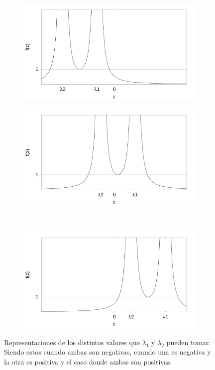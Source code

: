 \documentclass[12pt]{article}
\begin{document}
\begin{figure}[h]
\centering
 \begin{subfigure}[b]{0.4\textwidth}
 	 \includegraphics[width=\textwidth]{grafica_lambdas_negativas.png}
 	 \caption{}
 	 \label{fig:lamdas_negativas}
 \end{subfigure}
 
 \begin{subfigure}[b]{0.4\textwidth}
 \includegraphics[width=\textwidth]{grafica_lambdas_alternadas.png}
 \caption{}
 \label{fig:lamdas_alternadas}
 \end{subfigure}
 ~
  \begin{subfigure}[b]{0.4\textwidth}
 \includegraphics[width=\textwidth]{grafica_lambdas_positivas.png}
  \caption{}
 \label{fig:lamdas_positivas}
 \end{subfigure}
 \caption{Representaciones de los distintos valores que $\lambda_1$ y $\lambda_2$ pueden tomar. Siendo estos cuando ambas son negativas, cuando una es negativa y la otra es positiva y el caso donde ambas son positivas.}\label{fig:valores_lambda}
\end{figure}
\end{document}

